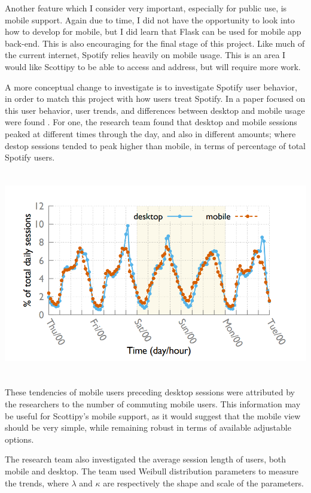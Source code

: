 Another feature which I consider very important, especially for public use, is
mobile support. Again due to time, I did not have the opportunity to look into how
to develop for mobile, but I did learn that Flask can be used for mobile app
back-end. This is also encouraging for the final stage of this project. Like
much of the current internet, Spotify relies heavily on mobile usage. This is an
area I would like Scottipy to be able to access and address, but will require more
work.

A more conceptual change to investigate is to investigate Spotify user behavior,
in order to match this project with how users treat Spotify. In a paper focused
on this user behavior, user trends, and differences between desktop and mobile
usage were found \cite{6566767}. For one, the research team found that desktop
and mobile sessions peaked at different times through the day, and also in
different amounts; where destop sessions tended to peak higher than mobile, in
terms of percentage of total Spotify users.

\begin{center}\includegraphics[height=9cm]{images/trends.png}
\end{center}

These tendencies of mobile users preceding desktop sessions were attributed by
the researchers to the number of commuting mobile users. This information may
be useful for Scottipy's mobile support, as it would suggest that the mobile view
should be very simple, while remaining robust in terms of available adjustable
options.

The research team also investigated the average session length of users, both
mobile and desktop. The team used Weibull distribution parameters to measure the
trends, where $\lambda$ and $\kappa$ are respectively the shape and scale of the
parameters.

